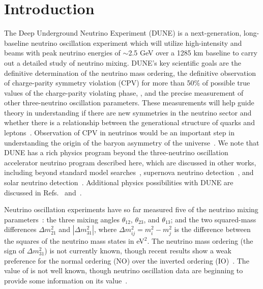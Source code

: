 \section{Introduction}
\label{sec:intro}

The Deep Underground Neutrino Experiment (DUNE) is a next-generation, long-baseline neutrino oscillation experiment which will utilize high-intensity \numu and \anumu beams with peak neutrino energies of $\sim$2.5 GeV over a 1285 km baseline to carry out a detailed study of neutrino mixing. DUNE's key scientific goals are the definitive determination of the neutrino mass ordering, the definitive observation of charge-parity symmetry violation (CPV) for more than 50\% of possible true values of the charge-parity violating phase, \deltacp, and the precise measurement of other three-neutrino oscillation parameters.
These measurements will help guide theory in understanding if there are new symmetries in the neutrino sector and whether there is a relationship between the generational structure of quarks and leptons~\cite{Qian:2015waa}. Observation of CPV in neutrinos would be an important step in understanding the origin of the baryon asymmetry of the universe~\cite{Fukugita:1986hr, Davidson:2008bu}. We note that DUNE has a rich physics program beyond the three-neutrino oscillation accelerator neutrino program described here, which are discussed in other works, including beyond standard model searches~\cite{Abi:2020kei}, supernova neutrino detection~\cite{Abi:2020lpk}, and solar neutrino detection~\cite{Capozzi:2018dat}. Additional physics possibilities with DUNE are discussed in Refs.~\cite{Abi:2020evt} and~\cite{AbedAbud:2021hpb}.

Neutrino oscillation experiments have so far measured five of the neutrino mixing parameters~\cite{Esteban:2018azc,deSalas:2017kay,Capozzi:2017yic}: the three mixing angles $\theta_{12}$, $\theta_{23}$, and $\theta_{13}$; and the two squared-mass differences $\Delta m^{2}_{21}$ and $|\Delta m^{2}_{31}|$, where $\Delta m^2_{ij} = m^2_{i} - m^{2}_{j}$ is the difference between the squares of the neutrino mass states in eV$^{2}$.
The neutrino mass ordering (the sign of $\Delta m^{2}_{31}$) is not currently known, though recent results show a weak preference for the normal ordering (NO) over the inverted ordering (IO)~\cite{Abe:2021gky,PhysRevD.97.072001,PhysRevLett.123.151803}.
The value of \deltacp is not well known, though neutrino oscillation data are beginning to provide some information on its value~\cite{Abe:2019vii,Abe:2021gky}.

